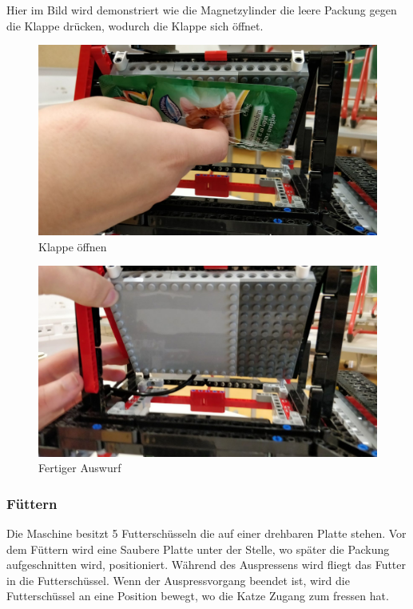 Hier im Bild wird demonstriert wie die Magnetzylinder die leere Packung gegen die Klappe drücken, wodurch die Klappe sich öffnet.

\begin{figure}[H]
\begin{center}
\includegraphics[width=13cm]{Bilder/Ablauf_1_png/Auswurf_4}
\caption{Klappe öffnen}
\end{center}
\end{figure}

\begin{figure}[H]
\begin{center}
\includegraphics[width=13cm]{Bilder/Ablauf_1_png/Auswurf_5}
\caption{Fertiger Auswurf}
\end{center}
\end{figure}

\subsubsection{Füttern}

Die Maschine besitzt 5 Futterschüsseln die auf einer drehbaren Platte stehen. Vor dem Füttern wird eine Saubere Platte unter der Stelle, wo später die Packung aufgeschnitten wird, positioniert. Während des Auspressens wird fliegt das Futter in die Futterschüssel. Wenn der Auspressvorgang beendet ist, wird die Futterschüssel an eine Position bewegt, wo die Katze Zugang zum fressen hat.
\newpage


